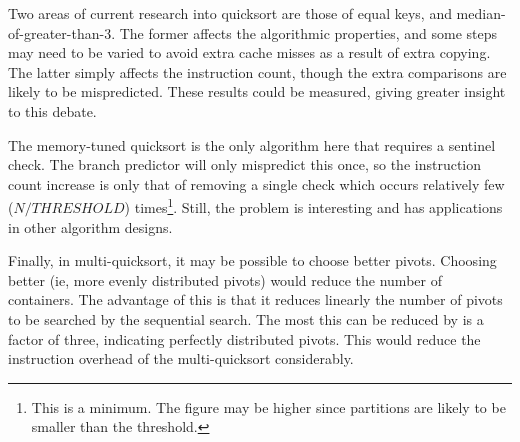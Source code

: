 Two areas of current research into quicksort are those of equal keys, and
median-of-greater-than-3. The former affects the algorithmic properties, and
some steps may need to be varied to avoid extra cache misses as a result
of extra copying. The latter simply affects the instruction count, though the
extra comparisons are likely to be mispredicted. These results could be
measured, giving greater insight to this debate.

The memory-tuned quicksort is the only algorithm here that requires a sentinel
check. The branch predictor will only mispredict this once, so the instruction
count increase is only that of removing a single check which occurs relatively
few ($N / THRESHOLD$) times\footnote{This is a minimum. The figure may be higher
since partitions are likely to be smaller than the threshold.}. Still, the
problem is interesting and has applications in other algorithm designs.

Finally, in multi-quicksort, it may be possible to choose better pivots.
Choosing better (ie, more evenly distributed pivots) would reduce the number of
containers. The advantage of this is that it reduces linearly the number of
pivots to be searched by the sequential search. The most this can be reduced by
is a factor of three, indicating perfectly distributed pivots. This would reduce
the instruction overhead of the multi-quicksort considerably.
